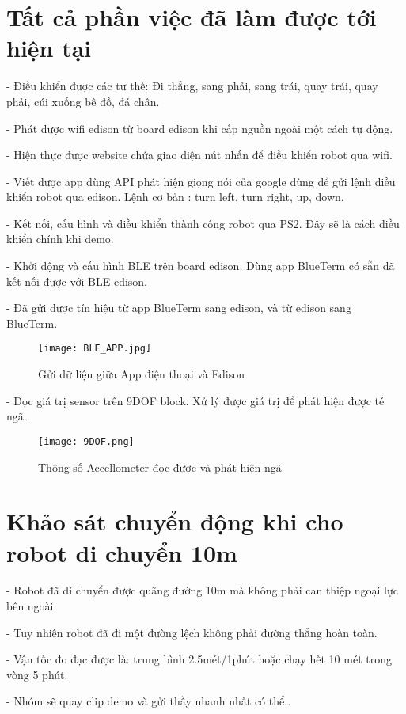 \documentclass[12pt,a4paper]{article}
\begin{document}
\section{Tất cả phần việc đã làm được tới hiện tại }
\textrm{- Điều khiển được các tư thế: Đi thẳng, sang phải, sang trái, quay trái, quay phải, cúi xuống bê đồ, đá chân}.\par
\textrm{- Phát được wifi edison từ board edison khi cấp nguồn ngoài một cách tự động}.\par
\textrm{- Hiện thực được website chứa giao diện nút nhấn để điều khiển robot qua wifi}.\par
\textrm{- Viết được app dùng API phát hiện giọng nói của google dùng để gửi lệnh điều khiển robot qua edison. Lệnh cơ bản : turn left, turn right, up, down}.\par
\textrm{- Kết nối, cấu hình và điều khiển thành công robot qua PS2. Đây sẽ là cách điều khiển chính khi demo}.\par
\textrm{- Khởi động và cấu hình BLE trên board edison. Dùng app BlueTerm có sẵn đã kết nối được với BLE edison}.\par
\textrm{- Đã gửi được tín hiệu từ app BlueTerm sang edison, và từ edison sang BlueTerm}.\par
\begin{center}
    \begin{figure}[htp]
    \begin{center}
	\texttt{[image: BLE\_APP.jpg]}
    \end{center}
    \caption{Gửi dữ liệu giữa App điện thoại và Edison}
    \label{refhinh1}
    \end{figure}
\end{center}
\textrm{- Đọc giá trị sensor trên 9DOF block. Xử lý được giá trị để phát hiện được té ngã.}.\par
\begin{center}
    \begin{figure}[htp]
    \begin{center}
     \texttt{[image: 9DOF.png]}
    \end{center}
    \caption{Thông số Accellometer đọc được và phát hiện ngã}
    \label{refhinh1}
    \end{figure}
\end{center}
\newpage
\newpage
\section{Khảo sát chuyển động khi cho robot di chuyển 10m }
\textrm{- Robot đã di chuyển được quãng đường 10m mà không phải can thiệp ngoại lực bên ngoài}.\par
\textrm{- Tuy nhiên robot đã đi một đường lệch không phải đường thẳng hoàn toàn}.\par
\textrm{- Vận tốc đo đạc được là: trung bình 2.5mét/1phút hoặc chạy hết 10 mét trong vòng 5 phút}.\par
\textrm{- Nhóm sẽ quay clip demo và gửi thầy nhanh nhất có thể.}.\par
\newpage
\newpage
\end{document}
